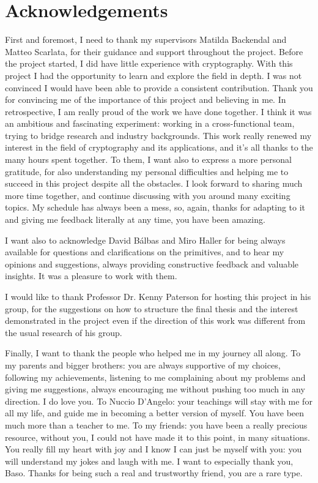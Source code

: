 \chapter*{Acknowledgements}

First and foremost, I need to thank my supervisors Matilda Backendal and Matteo Scarlata,
for their guidance and support throughout the project.
Before the project started, I did have little experience with
cryptography. With this project I had the opportunity to
learn and explore the field in depth. 
I was not convinced I would have been able to provide
a consistent contribution. 
Thank you for convincing me of the importance of this project
and believing in me.
In retrospective, I am really
proud of the work we have done together.
I think it was an ambitious and fascinating experiment:
working in a cross-functional team, trying to bridge
research and industry backgrounds.
This work really renewed my interest in the field of 
cryptography and its applications, and it's all thanks
to the many hours spent together.
To them, I want also to express a more personal gratitude,
for also understanding my personal difficulties and
helping me to succeed in this project despite all the obstacles.
I look forward to sharing much more time together, and continue
discussing with you around many exciting topics.
My schedule has always been a mess,
so, again, thanks for adapting to it and giving me feedback literally
at any time, you have been amazing.

I want also to acknowledge David B{\'a}lbas and Miro Haller for 
being always available for questions and clarifications on the primitives,
and to hear my opinions and suggestions, always providing
constructive feedback and valuable insights. It was a pleasure
to work with them.

I would like to thank Professor Dr. Kenny Paterson
for hosting this project in his group, for the suggestions
on how to structure the final thesis and the interest
demonstrated in the project even if the direction
of this work was different from the usual research of his group.

Finally, I want to thank the people who helped me in my journey all along.
To my parents and bigger brothers: you are always supportive of my choices,
following my achievements, listening to me complaining about my problems
and giving me suggestions, 
always encouraging me without pushing too much in any direction. I do love you.
\newline
To Nuccio D'Angelo: your teachings will stay with me for all my life,
and guide me in becoming a better version of myself. 
You have been much more than a teacher to me. 
\newline
To my friends: you have been a really precious resource, without you, 
I could not have made it to this point, in many situations.
You really fill my heart with joy and I know I can just be
myself with you: you will understand my jokes and laugh with me.
I want to especially thank you, Baso. Thanks for being such a 
real and trustworthy friend, you are a rare type.

